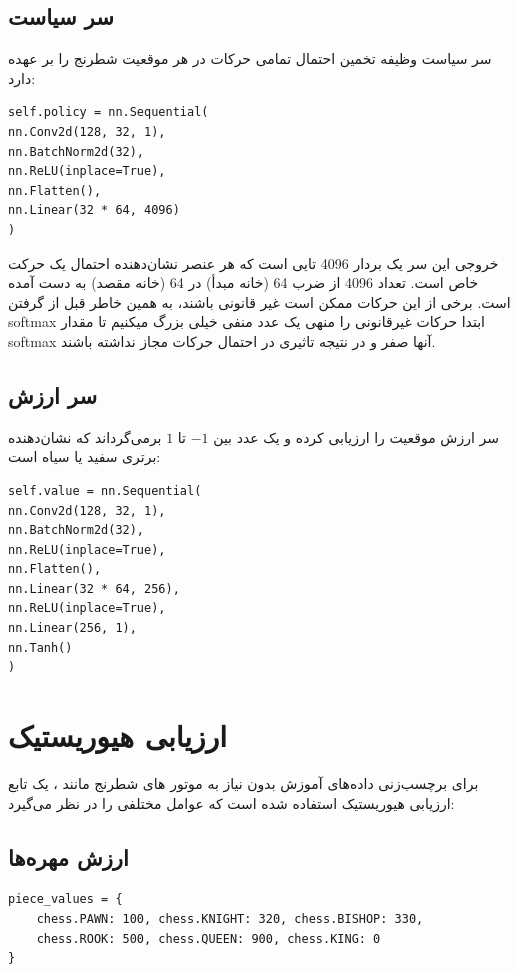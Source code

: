 \documentclass[12pt,a4paper]{article}
\begin{document}
	\subsection{سر سیاست 
		}
	سر سیاست وظیفه تخمین احتمال  تمامی حرکات در هر موقعیت  شطرنج را بر عهده دارد:
	\\
	\begin{latin}
\begin{verbatim}
self.policy = nn.Sequential(
nn.Conv2d(128, 32, 1),
nn.BatchNorm2d(32),
nn.ReLU(inplace=True),
nn.Flatten(),
nn.Linear(32 * 64, 4096)
)
\end{verbatim}
	\end{latin}
	خروجی این سر یک بردار 4096 تایی است که هر عنصر نشان‌دهنده احتمال یک حرکت خاص است. تعداد 4096 از ضرب 64 (خانه مبدأ) در 64 (خانه مقصد) به دست آمده است. برخی از این حرکات ممکن است غیر قانونی باشند، به همین خاطر قبل از گرفتن 
    softmax
    ابتدا حرکات غیرقانونی را منهی یک عدد منفی خیلی بزرگ میکنیم تا مقدار softmax آنها صفر و در نتیجه تاثیری در احتمال حرکات مجاز نداشته باشند.
	
	\subsection{سر ارزش
		 }
	سر ارزش موقعیت را ارزیابی کرده و یک عدد بین $-1$ تا $ 1$ برمی‌گرداند که نشان‌دهنده برتری سفید یا سیاه است:
	\\
	\begin{latin}
\begin{verbatim}
self.value = nn.Sequential(
nn.Conv2d(128, 32, 1),
nn.BatchNorm2d(32),
nn.ReLU(inplace=True),
nn.Flatten(),
nn.Linear(32 * 64, 256),
nn.ReLU(inplace=True),
nn.Linear(256, 1),
nn.Tanh()
)
\end{verbatim}
	\end{latin}
	\section{ارزیابی هیوریستیک}
	برای برچسب‌زنی داده‌های آموزش بدون نیاز به موتور های شطرنج مانند
	، یک تابع ارزیابی هیوریستیک استفاده شده است که عوامل مختلفی را در نظر می‌گیرد:
	\\
	\subsection{ارزش مهره‌ها}
	\begin{latin}
\begin{verbatim}
piece_values = {
    chess.PAWN: 100, chess.KNIGHT: 320, chess.BISHOP: 330,
    chess.ROOK: 500, chess.QUEEN: 900, chess.KING: 0
}
\end{verbatim}
	\end{latin}
\end{document}
